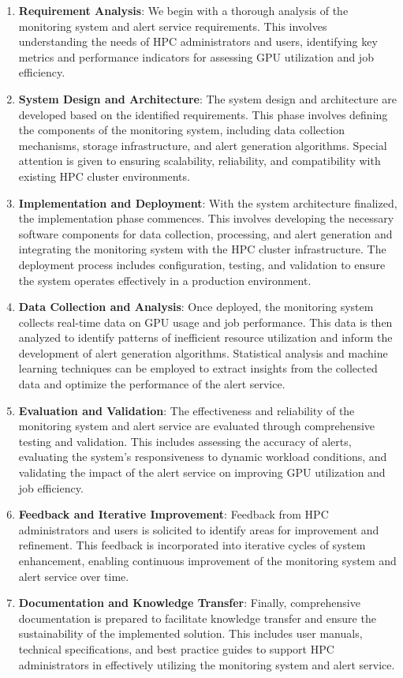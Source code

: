 \begin{enumerate}
    \item \textbf{Requirement Analysis}: We begin with a thorough analysis of the monitoring system and alert service requirements. This involves understanding the needs of HPC administrators and users, identifying key metrics and performance indicators for assessing GPU utilization and job efficiency.
    \item \textbf{System Design and Architecture}: The system design and architecture are developed based on the identified requirements. This phase involves defining the components of the monitoring system, including data collection mechanisms, storage infrastructure, and alert generation algorithms. Special attention is given to ensuring scalability, reliability, and compatibility with existing HPC cluster environments.
    \item \textbf{Implementation and Deployment}: With the system architecture finalized, the implementation phase commences. This involves developing the necessary software components for data collection, processing, and alert generation and integrating the monitoring system with the HPC cluster infrastructure. The deployment process includes configuration, testing, and validation to ensure the system operates effectively in a production environment.
    \item \textbf{Data Collection and Analysis}: Once deployed, the monitoring system collects real-time data on GPU usage and job performance. This data is then analyzed to identify patterns of inefficient resource utilization and inform the development of alert generation algorithms. Statistical analysis and machine learning techniques can be employed to extract insights from the collected data and optimize the performance of the alert service.
    \item \textbf{Evaluation and Validation}: The effectiveness and reliability of the monitoring system and alert service are evaluated through comprehensive testing and validation. This includes assessing the accuracy of alerts, evaluating the system's responsiveness to dynamic workload conditions, and validating the impact of the alert service on improving GPU utilization and job efficiency.
    \item \textbf{Feedback and Iterative Improvement}: Feedback from HPC administrators and users is solicited to identify areas for improvement and refinement. This feedback is incorporated into iterative cycles of system enhancement, enabling continuous improvement of the monitoring system and alert service over time.
    \item \textbf{Documentation and Knowledge Transfer}: Finally, comprehensive documentation is prepared to facilitate knowledge transfer and ensure the sustainability of the implemented solution. This includes user manuals, technical specifications, and best practice guides to support HPC administrators in effectively utilizing the monitoring system and alert service.
\end{enumerate}

